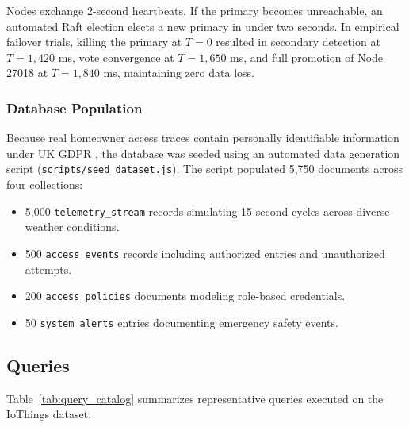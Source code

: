 \documentclass[11pt,a4paper]{article}
\begin{document}
Nodes exchange 2-second heartbeats. If the primary becomes unreachable, an automated Raft election elects a new primary in under two seconds. In empirical failover trials, killing the primary at $T=0$ resulted in secondary detection at $T=1,420$ ms, vote convergence at $T=1,650$ ms, and full promotion of Node 27018 at $T=1,840$ ms, maintaining zero data loss.

\subsubsection{Database Population}
Because real homeowner access traces contain personally identifiable information under UK GDPR \citep{ico2021}, the database was seeded using an automated data generation script (\texttt{scripts/seed\_dataset.js}). The script populated 5,750 documents across four collections:
\begin{itemize}[noitemsep]
    \item 5,000 \texttt{telemetry\_stream} records simulating 15-second cycles across diverse weather conditions.
    \item 500 \texttt{access\_events} records including authorized entries and unauthorized attempts.
    \item 200 \texttt{access\_policies} documents modeling role-based credentials.
    \item 50 \texttt{system\_alerts} entries documenting emergency safety events.
\end{itemize}

\subsection{Queries}
Table~\ref{tab:query_catalog} summarizes representative queries executed on the IoThings dataset.
\end{document}
